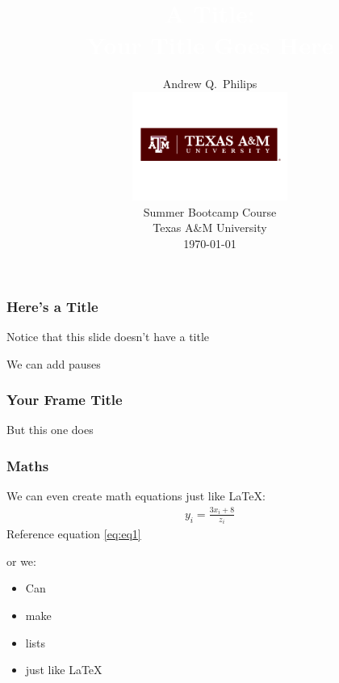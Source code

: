 \documentclass[english,xcolor=dvipsnames]{beamer}
\title[2015 Presentation]{\textcolor{white}{A Title:\\
Your Title Goes Here}}
\author[Philips 2015]{{\large Andrew Q.\ Philips}\\
\includegraphics[width=2in,height=1.4in]{TAM-PrimaryMarkA.png}\\
{\small  Summer Bootcamp Course \\
Texas A\&M University \\
	\today }}
\begin{document}
\frame{\titlepage}


\begin{frame}\frametitle{Here's a Title}
	\begin{center}
	 Notice that this slide doesn't have a title \\
	 \end{center} 
	We can add pauses \\
\end{frame}

\begin{frame}\frametitle{Your Frame Title}
	But this one does  
\end{frame}

\begin{frame}\frametitle{Maths}
	We can even create math equations just like \LaTeX:
	\begin{align}\label{eq:eq1}
	y_{i}=\frac{3x_{i}+8}{z_{i}}
	\end{align}
	{\color{cyan} Reference equation} \ref{eq:eq1}
	\pause
	
	or we:
	\begin{itemize}
		\item Can
		\item make
		\item lists
		\item just like \LaTeX
	\end{itemize}  
\end{frame}
\end{document}
